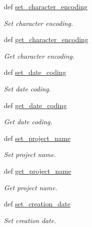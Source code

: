 \begin{DoxyCompactItemize}
def \hyperlink{classlmf_1_1src_1_1core_1_1lexical__resource_1_1_lexical_resource_ad70b5972f5dade9c6d2819c66ab30e54}{set\+\_\+character\+\_\+encoding}
\begin{DoxyCompactList}\small\item\em Set character encoding. \end{DoxyCompactList}\item 
def \hyperlink{classlmf_1_1src_1_1core_1_1lexical__resource_1_1_lexical_resource_aa0be0e62560c39c0daae180390df89de}{get\+\_\+character\+\_\+encoding}
\begin{DoxyCompactList}\small\item\em Get character encoding. \end{DoxyCompactList}\item 
def \hyperlink{classlmf_1_1src_1_1core_1_1lexical__resource_1_1_lexical_resource_a41045a1b5ce16a16f48259424c2954b8}{set\+\_\+date\+\_\+coding}
\begin{DoxyCompactList}\small\item\em Set date coding. \end{DoxyCompactList}\item 
def \hyperlink{classlmf_1_1src_1_1core_1_1lexical__resource_1_1_lexical_resource_a173f912d1be15b60bdb44c3cbaa79c5c}{get\+\_\+date\+\_\+coding}
\begin{DoxyCompactList}\small\item\em Get date coding. \end{DoxyCompactList}\item 
def \hyperlink{classlmf_1_1src_1_1core_1_1lexical__resource_1_1_lexical_resource_a20d7709edf43c05f2050c2c608a01496}{set\+\_\+project\+\_\+name}
\begin{DoxyCompactList}\small\item\em Set project name. \end{DoxyCompactList}\item 
def \hyperlink{classlmf_1_1src_1_1core_1_1lexical__resource_1_1_lexical_resource_abb2209e322ce17f6c384d8c73844894a}{get\+\_\+project\+\_\+name}
\begin{DoxyCompactList}\small\item\em Get project name. \end{DoxyCompactList}\item 
def \hyperlink{classlmf_1_1src_1_1core_1_1lexical__resource_1_1_lexical_resource_a65860b26504bc3dc07212506082f5ae1}{set\+\_\+creation\+\_\+date}
\begin{DoxyCompactList}\small\item\em Set creation date. \end{DoxyCompactList}\item 

\end{DoxyCompactItemize}

